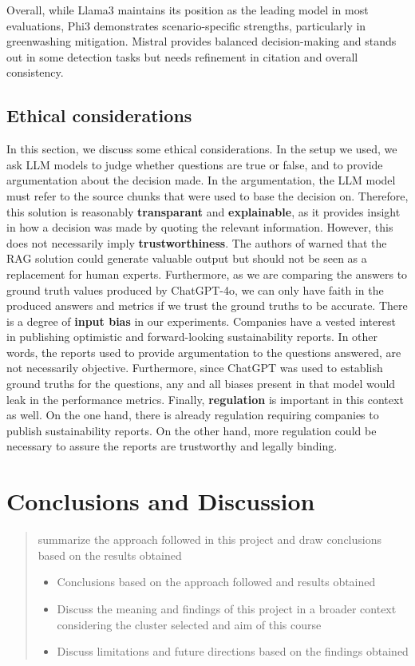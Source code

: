 \documentclass[]{article}
\begin{document}
Overall, while Llama3 maintains its position as the leading model in most evaluations, Phi3 demonstrates scenario-specific strengths, particularly in greenwashing mitigation. 
Mistral provides balanced decision-making and stands out in some detection tasks but needs refinement in citation and overall consistency.  

\subsection{Ethical considerations}

In this section, we discuss some ethical considerations.
In the setup we used, we ask LLM models to judge whether questions are true or false, and to provide argumentation about the decision made.
In the argumentation, the LLM model must refer to the source chunks that were used to base the decision on.
Therefore, this solution is reasonably \textbf{transparant} and \textbf{explainable}, as it provides insight in how a decision was made by quoting the relevant information.
However, this does not necessarily imply \textbf{trustworthiness}.
The authors of \cite{durability} warned that the RAG solution could generate valuable output but should not be seen as a replacement for human experts.
Furthermore, as we are comparing the answers to ground truth values produced by ChatGPT-4o, we can only have faith in the produced answers and metrics if we trust the ground truths to be accurate.
There is a degree of \textbf{input bias} in our experiments.
Companies have a vested interest in publishing optimistic and forward-looking sustainability reports.
In other words, the reports used to provide argumentation to the questions answered, are not necessarily objective.
Furthermore, since ChatGPT was used to establish ground truths for the questions, any and all biases present in that model would leak in the performance metrics.
Finally, \textbf{regulation} is important in this context as well.
On the one hand, there is already regulation requiring companies to publish sustainability reports.
On the other hand, more regulation could be necessary to assure the reports are trustworthy and legally binding.

\section{Conclusions and Discussion} \label{sec:conclusions}

\begin{quotation}
    summarize the approach followed in this project and draw conclusions based on the results obtained
    \begin{itemize}
        \item Conclusions based on the approach followed and results obtained
        \item Discuss the meaning and findings of this project in a broader context considering the cluster selected and aim of this course
        \item Discuss limitations and future directions based on the findings obtained
    \end{itemize}
\end{quotation}

\printbibliography
\end{document}

